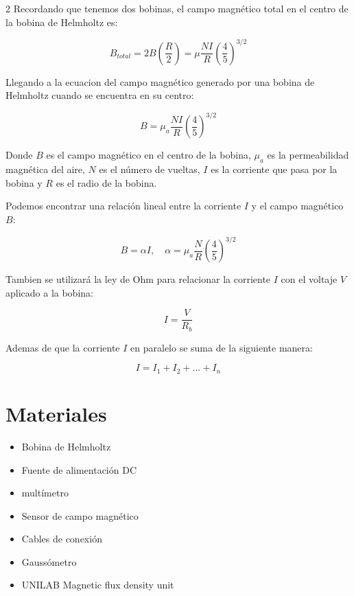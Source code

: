 \documentclass{article}
\begin{document}
\begin{multicols}{2}
    Recordando que tenemos dos bobinas, el campo magnético total en el centro de la bobina de Helmholtz es:

        \begin{equation}
            B_{total} = 2B(\frac{R}{2}) = \mu \frac{NI}{R} \left(\frac{4}{5}\right)^{3/2}
        \end{equation}

    Llegando a la ecuacion del campo magnético generado por una bobina de Helmholtz \cite{bobinaHz} cuando se encuentra en su centro:

    \begin{equation}
        B = \mu_a \frac{NI}{R} \left(\frac{4}{5}\right)^{3/2}
    \end{equation}

    Donde $B$ es el campo magnético en el centro de la bobina, $\mu_a$ es la permeabilidad magnética del aire, $N$ es el número de 
    vueltas, $I$ es la corriente que pasa por la bobina y $R$ es el radio de la bobina.

    Podemos encontrar una relación lineal entre la corriente $I$ y el campo magnético $B$:

        \begin{equation}
            B = \alpha I , \quad \alpha = \mu_a \frac{N}{R} \left(\frac{4}{5}\right)^{3/2}
        \end{equation}

    Tambien se utilizará la ley de Ohm para relacionar la corriente $I$ con el voltaje $V$ aplicado a la bobina:

        \begin{equation}
            I = \frac{V}{R_{b}}
        \end{equation}

    Ademas de que la corriente $I$ en paralelo se suma de la siguiente manera:

        \begin{equation}
            I = I_1 + I_2 + ... + I_n
        \end{equation}

    
\section*{Materiales}

    \begin{itemize}
        \item Bobina de Helmholtz
        \item Fuente de alimentación DC
        \item multímetro
        \item Sensor de campo magnético
        \item Cables de conexión
        \item Gaussómetro
        \item UNILAB Magnetic flux density unit
    \end{itemize}


\end{multicols}
\end{document}
